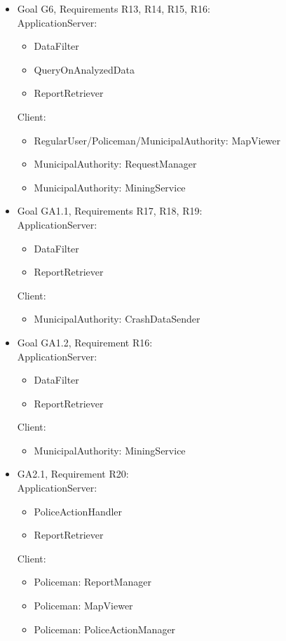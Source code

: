 \begin{itemize}
	\item Goal G6, Requirements R13, R14, R15, R16:\\ApplicationServer:
	\begin{itemize}
		\item DataFilter
		\item QueryOnAnalyzedData
		\item ReportRetriever
	\end{itemize}
	\newpage
	Client:
	\begin{itemize}
		\item RegularUser/Policeman/MunicipalAuthority: MapViewer
		\item MunicipalAuthority: RequestManager
		\item MunicipalAuthority: MiningService
	\end{itemize}
	\item Goal GA1.1, Requirements R17, R18, R19:\\
	ApplicationServer:
	\begin{itemize}
		\item DataFilter
		\item ReportRetriever
	\end{itemize}
	Client:
	\begin{itemize}
		\item MunicipalAuthority: CrashDataSender
	\end{itemize}
	\item Goal GA1.2, Requirement R16:\\
	ApplicationServer:
	\begin{itemize}
		\item DataFilter
		\item ReportRetriever
	\end{itemize}
	Client:
	\begin{itemize}
		\item MunicipalAuthority: MiningService
	\end{itemize}
	\item GA2.1, Requirement R20:\\
	ApplicationServer:
	\begin{itemize}
		\item PoliceActionHandler
		\item ReportRetriever
	\end{itemize}
	Client:
	\begin{itemize}
		\item Policeman: ReportManager
		\item Policeman: MapViewer
		\item Policeman: PoliceActionManager

\end{itemize}
\end{itemize}
